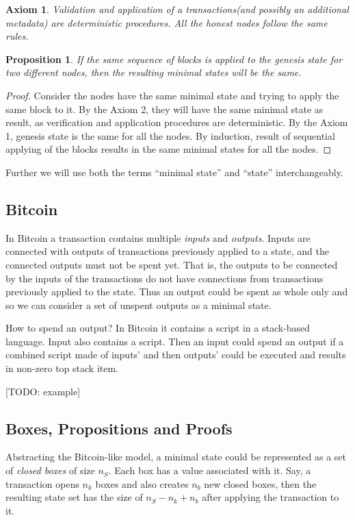 \documentclass[]{report}   %
\newtheorem{axiom}{Axiom}
\newtheorem{proposition}{Proposition}
\begin{document}
    \begin{axiom} 
     Validation and application of a transactions(and possibly an additional metadata) are deterministic procedures. All the honest nodes follow the same rules. 
    \end{axiom}

	\begin{proposition} If the same sequence of blocks is applied to the genesis state for two different nodes, then the resulting minimal states will be the same.
	\end{proposition}	
	\begin{proof}Consider the nodes have the same minimal state and trying to apply the same block to it. By the Axiom 2, they will have the same minimal state as result, as verification and application procedures are deterministic. By the Axiom 1, genesis state is the same for all the nodes. By induction, result of sequential applying of the blocks results in the same minimal states for all the nodes.\end{proof}

Further we will use both the terms ``minimal state'' and ``state'' interchangeably. 


\subsection{Bitcoin}

In Bitcoin a transaction contains multiple \textit{inputs} and \textit{outputs}. Inputs are connected with outputs of transactions previously applied to a state, and the connected outputs must not be spent yet. That is, the outputs to be connected by the inputs of the transactions do not have connections from transactions previously applied to the state. Thus an output could be spent as whole only and so we can consider a set of unspent outputs as a minimal state.

How to spend an output? In Bitcoin it contains a script in a stack-based language. Input also contains a script. Then an input could spend an output if a combined script made of inputs' and then outputs' could be executed and results in non-zero top stack item.

[TODO: example]

\subsection{Boxes, Propositions and Proofs}

Abstracting the Bitcoin-like model, a minimal state could be represented as a set of \textit{closed boxes} of size \(n_S\). Each box has a value associated with it. Say, a transaction opens \(n_k\) boxes and also creates \(n_b\) new closed boxes, then the resulting state set has the size of \(n_S-n_k+n_b\) after applying the transaction to it. 
\end{document}
